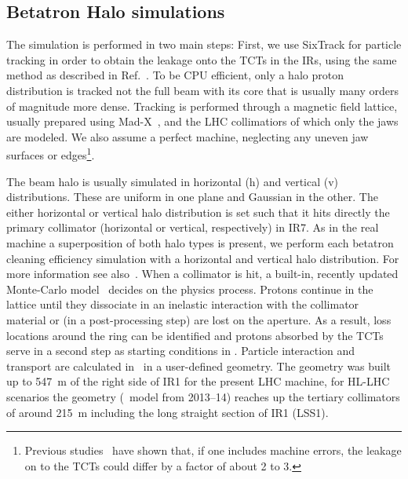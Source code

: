 \subsection{Betatron Halo simulations}
The simulation is performed in two main steps: First, we use SixTrack for particle tracking in order to obtain the leakage onto the TCTs in the IRs, using the same method as described in Ref.~\cite{nimPaperRod}. To be CPU efficient, only a halo proton distribution is tracked not the full beam with its core that is usually many orders of magnitude more dense. Tracking is performed through a magnetic field lattice, usually prepared using Mad-X~\cite{madx}, and the LHC collimatiors of which only the jaws are modeled. We also assume a perfect machine, neglecting any uneven jaw surfaces or edges\footnote{Previous studies~\cite{roderikSimMeasPaper} have shown that, if one includes machine errors, the leakage on to the TCTs could differ by a factor of about 2 to 3.}.

The beam halo is usually simulated in horizontal (h) and vertical (v) distributions. These are uniform in one plane and Gaussian in the other. The either horizontal or vertical halo distribution is set such that it hits directly the primary collimator (horizontal or vertical, respectively) in IR7. As in the real machine a superposition of both halo types is present, we perform each betatron cleaning efficiency simulation with a horizontal and vertical halo distribution. For more information see also~\cite{chiarasThesis}. When a collimator is hit, a built-in, recently updated Monte-Carlo model~\cite{claudiasThesis} decides on the physics process. Protons continue in the lattice until they dissociate in an inelastic interaction with the collimator material or (in a post-processing step) are lost on the aperture. As a result, loss locations around the ring can be identified and protons absorbed by the TCTs serve in a second step as starting conditions in \fluka. Particle interaction and transport are calculated in \fluka~in a user-defined geometry. The geometry was built up to 547~m of the right side of IR1 for the present LHC machine, for HL-LHC scenarios the geometry (\fluka~model from 2013--14) reaches up the tertiary collimators of around 215~m including the long straight section of IR1 (LSS1).


